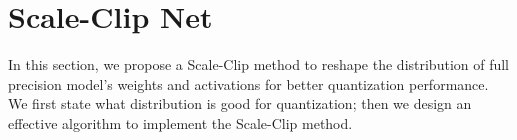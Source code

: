 \documentclass[letterpaper]{article} %
\begin{document}





\section{Scale-Clip Net}
In this section, we propose a Scale-Clip method to reshape the distribution of full precision model's weights and activations for better quantization performance.
We first state what distribution is good for quantization;
then we design an effective algorithm to implement the Scale-Clip method.
\end{document}
